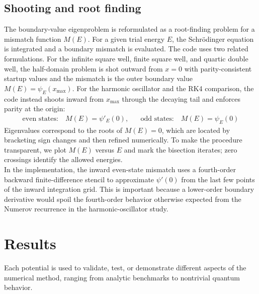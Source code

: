 \documentclass[11pt]{article}
\begin{document}
\begin{refsection}
        \subsection{Shooting and root finding}
            The boundary-value eigenproblem is reformulated as a root-finding problem for a mismatch function $M(E)$. For a given trial energy $E$, the Schr\"odinger equation is integrated and a boundary mismatch is evaluated. The code uses two related formulations. For the infinite square well, finite square well, and quartic double well, the half-domain problem is shot outward from $x=0$ with parity-consistent startup values and the mismatch is the outer boundary value $M(E)=\psi_E(x_{\max})$. For the harmonic oscillator and the RK4 comparison, the code instead shoots inward from $x_{\max}$ through the decaying tail and enforces parity at the origin:
            \begin{align}
            \text{even states:}\quad M(E) = \psi'_E(0),\,\,\,\,\,\,\,\,\,\,\text{odd states:}\quad M(E) = \psi_E(0)
            \end{align}
            Eigenvalues correspond to the roots of $M(E)=0$, which are located by bracketing sign changes and then refined numerically. To make the procedure transparent, we plot $M(E)$ versus $E$ and mark the bisection iterates; zero crossings identify the allowed energies. \\

            In the implementation, the inward even-state mismatch uses a fourth-order backward finite-difference stencil to approximate $\psi'(0)$ from the last few points of the inward integration grid. This is important because a lower-order boundary derivative would spoil the fourth-order behavior otherwise expected from the Numerov recurrence in the harmonic-oscillator study.

    \section{Results}
        Each potential is used to validate, test, or demonstrate different aspects of the numerical method, ranging from analytic benchmarks to nontrivial quantum behavior.


\end{refsection}
\end{document}
